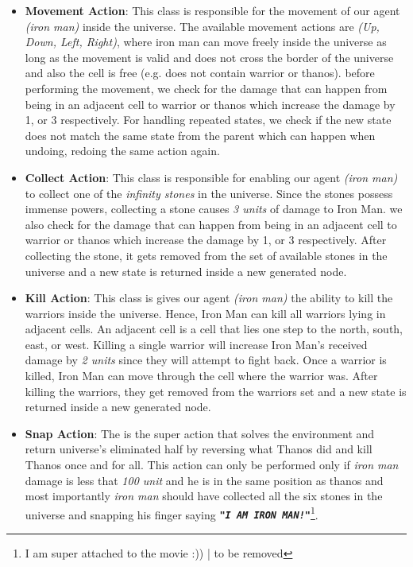 \documentclass{article}
\newcommand{\ironman}[1]{\colorbox{ironmancolor}{\texttt{#1}}}
\begin{document}
\begin{itemize}
  \item \textbf{Movement Action}: This class is responsible for the movement of our agent \textit{(iron man)} inside the universe. The available movement actions are \textit{(Up, Down, Left, Right)}, where iron man can move freely inside the universe as long as the movement is valid and does not cross the border of the universe and also the cell is free (e.g. does not contain warrior or thanos). before performing the movement, we check for the damage that can happen from being in an adjacent cell to warrior or thanos which increase the damage by 1, or 3 respectively. For handling repeated states, we check if the new state does not match the same state from the parent which can happen when undoing, redoing the same action again.

  \item \textbf{Collect Action}: This class is responsible for enabling our agent \textit{(iron man)} to collect one of the \textit{infinity stones} in the universe. Since the stones possess immense powers, collecting a stone causes \textit{3 units} of damage to Iron Man. we also check for the damage that can happen from being in an adjacent cell to warrior or thanos which increase the damage by 1, or 3 respectively. After collecting the stone, it gets removed from the set of available stones in the universe and a new state is returned inside a new generated node.

  \item \textbf{Kill Action}: This class is gives our agent \textit{(iron man)} the ability to kill the warriors inside the universe. Hence, Iron Man can kill all warriors lying in adjacent cells. An adjacent cell is a cell that lies one step to the north, south, east, or west. Killing a single warrior will increase Iron Man’s received damage by \textit{2 units} since they will attempt to fight back. Once a warrior is killed, Iron Man can move through the cell where the warrior was. After killing the warriors, they get removed from the warriors set and a new state is returned inside a new generated node.


  \item \textbf{Snap Action}: The is the super action that solves the environment and return universe's eliminated half by reversing what Thanos did and kill Thanos once and for all. This action can only be performed only if \textit{iron man} damage is less that \textit{100 unit} and he is in the same position as thanos and most importantly \textit{iron man} should have collected all the six stones in the universe and snapping his finger saying \ironman{\textbf{\textit{"I AM IRON MAN!"}}}\footnote{I am super attached to the movie :)) | to be removed}.

\end{itemize}
\end{document}
